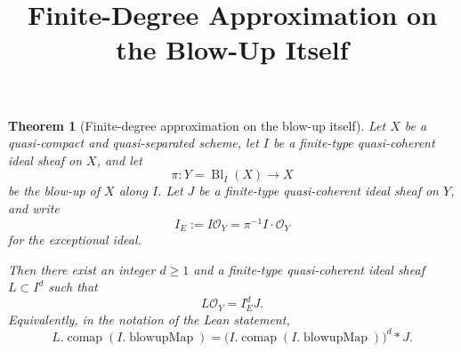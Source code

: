 \documentclass[11pt]{article}
\title{Finite-Degree Approximation on the Blow-Up Itself}
\author{}
\date{}
\newtheorem{theorem}{Theorem}
\newcommand{\OO}{\mathcal O}
\newcommand{\Bl}{\operatorname{Bl}}
\begin{document}
\maketitle

\begin{theorem}[Finite-degree approximation on the blow-up itself]
Let $X$ be a quasi-compact and quasi-separated scheme, let $I$ be a finite-type
quasi-coherent ideal sheaf on $X$, and let
\[
  \pi:Y=\Bl_I(X)\longrightarrow X
\]
be the blow-up of $X$ along $I$.
Let $J$ be a finite-type quasi-coherent ideal sheaf on $Y$, and write
\[
  I_E := I\OO_Y = \pi^{-1}I\cdot \OO_Y
\]
for the exceptional ideal.

Then there exist an integer $d\geq 1$ and a finite-type quasi-coherent ideal
sheaf $L\subset I^d$ such that
\[
  L\OO_Y = I_E^d J.
\]
Equivalently, in the notation of the Lean statement,
\[
  L.\operatorname{comap}(I.\operatorname{blowupMap})
  =
  \bigl(I.\operatorname{comap}(I.\operatorname{blowupMap})\bigr)^d * J.
\]
\end{theorem}
\end{document}
